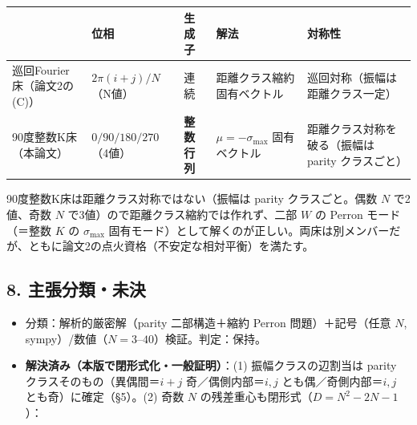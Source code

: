 \documentclass[
  a4paper,
]{ltjsarticle}
\newcounter{none} %
\providecommand{\tightlist}{%
  \setlength{\itemsep}{0pt}\setlength{\parskip}{0pt}}
\begin{document}
{\def\LTcaptype{none} %
\begin{longtable}[]{@{}
  >{\raggedright\arraybackslash}p{}
  >{\raggedright\arraybackslash}p{}
  >{\raggedright\arraybackslash}p{}
  >{\raggedright\arraybackslash}p{}
  >{\raggedright\arraybackslash}p{}@{}}
\toprule\noalign{}
\begin{minipage}[b]{\linewidth}\raggedright
\end{minipage} & \begin{minipage}[b]{\linewidth}\raggedright
位相
\end{minipage} & \begin{minipage}[b]{\linewidth}\raggedright
生成子
\end{minipage} & \begin{minipage}[b]{\linewidth}\raggedright
解法
\end{minipage} & \begin{minipage}[b]{\linewidth}\raggedright
対称性
\end{minipage} \\
\midrule\noalign{}
\endhead
\bottomrule\noalign{}
\endlastfoot
巡回Fourier床（論文2の(C)） & \(2\pi(i+j)/N\)（N値） & 連続 &
距離クラス縮約固有ベクトル & 巡回対称（振幅は距離クラス一定） \\
90度整数K床（本論文） & \(0/90/180/270\)（4値） & \textbf{整数行列} &
\(\mu=-\sigma_{\max}\) 固有ベクトル & 距離クラス対称を破る（振幅は
parity クラスごと） \\
\end{longtable}
}

90度整数K床は距離クラス対称ではない（振幅は parity クラスごと。偶数
\(N\) で2値、奇数 \(N\) で3値）ので距離クラス縮約では作れず、二部 \(W\)
の Perron モード（＝整数 \(K\) の \(\sigma_{\max}\)
固有モード）として解くのが正しい。両床は別メンバーだが、ともに論文2の点火資格（不安定な相対平衡）を満たす。

\subsection{8.
主張分類・未決}\label{ux4e3bux5f35ux5206ux985eux672aux6c7a}

\begin{itemize}
\tightlist
\item
  分類：解析的厳密解（parity 二部構造＋縮約 Perron 問題）＋記号（任意
  \(N\), sympy）/数値（\(N=3\)--\(40\)）検証。判定：保持。
\item
  \textbf{解決済み（本版で閉形式化・一般証明）}：(1)
  振幅クラスの辺割当は parity クラスそのもの（異偶間＝\(i+j\)
  奇／偶側内部＝\(i,j\) とも偶／奇側内部＝\(i,j\)
  とも奇）に確定（§5）。(2) 奇数 \(N\)
  の残差重心も閉形式（\(D=N^2-2N-1\)）：
\end{itemize}
\end{document}
